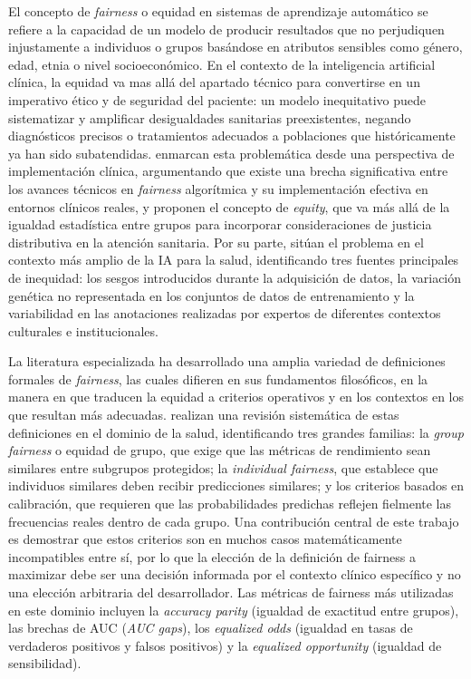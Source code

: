El concepto de \textit{fairness}  o equidad en sistemas de aprendizaje automático se refiere a la capacidad de un modelo de
producir resultados que no perjudiquen injustamente a individuos o grupos  basándose en 
atributos sensibles como género, edad, etnia o nivel socioeconómico. En el contexto de la inteligencia artificial
clínica, la equidad va mas allá del apartado técnico para convertirse en un imperativo ético
y de seguridad del paciente: un modelo inequitativo puede sistematizar y amplificar desigualdades sanitarias 
preexistentes, negando diagnósticos precisos o tratamientos adecuados a poblaciones que históricamente ya han 
sido subatendidas. \citeauthor{liu2023translational} enmarcan esta problemática desde una perspectiva 
de implementación clínica, argumentando que existe una brecha significativa entre los avances técnicos en 
\textit{fairness} algorítmica y su implementación efectiva en entornos clínicos reales, y proponen el concepto de 
\textit{equity}, que va más allá de la igualdad estadística entre grupos para incorporar consideraciones 
de justicia distributiva en la atención sanitaria. Por su parte, 
\citeauthor{williamson2023} sitúan el problema en el contexto más amplio de la IA para la salud, identificando
tres fuentes principales de inequidad: los sesgos introducidos durante la adquisición de datos, la variación
genética no representada en los conjuntos de datos de entrenamiento y la variabilidad en las anotaciones realizadas 
por expertos de diferentes contextos culturales e institucionales.

La literatura especializada ha desarrollado una amplia variedad de definiciones formales de \textit{fairness}, 
las cuales difieren en sus fundamentos filosóficos, en la manera en que traducen la equidad a criterios operativos 
y en los contextos en los que resultan más adecuadas. \citeauthor{gao2024} realizan una revisión sistemática de 
estas definiciones en el dominio de la 
salud, identificando tres grandes familias: la \textit{group fairness} o equidad de grupo, que exige que las 
métricas de rendimiento sean similares entre subgrupos protegidos; la \textit{individual fairness}, que establece 
que individuos similares deben recibir predicciones similares; y los criterios basados en calibración, que requieren 
que las probabilidades predichas reflejen fielmente las frecuencias reales dentro de cada grupo. 
Una contribución central de este trabajo es demostrar que estos criterios son en muchos casos matemáticamente 
incompatibles entre sí, por lo que la elección de la definición de fairness a maximizar debe ser una decisión 
informada por el contexto clínico específico y no una elección arbitraria del desarrollador. Las métricas de 
fairness más utilizadas en este dominio incluyen la \textit{accuracy parity} (igualdad de exactitud entre grupos), 
las brechas de AUC (\textit{AUC gaps}), los \textit{equalized odds} (igualdad en tasas de verdaderos positivos y 
falsos positivos) y la \textit{equalized opportunity} (igualdad de sensibilidad). 

